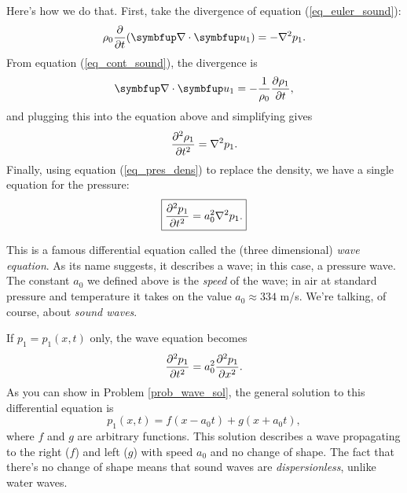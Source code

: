 Here's how we do that.  First, take the divergence of equation (\ref{eq_euler_sound}):
\[
\rho_0 \dfdx{}{t} (\grad \cdot \vec{u}_1 )= -\nabla^2 p_1.
\]
From equation (\ref{eq_cont_sound}), the divergence is
\[
\grad \cdot \vec{u}_1 = -\frac{1}{\rho_0} \dfdx{\rho_1}{t},
\]
and plugging this into the equation above and simplifying gives
\[
\frac{\partial^2 {\rho_1}}{\partial {t}^2} = \nabla^2 p_1.
\]
Finally, using equation (\ref{eq_pres_dens}) to replace the density, we have a single equation for the pressure:
\begin{equation}
\boxed{
\frac{\partial^2 {p_1}}{\partial {t}^2} = a_0^2 \nabla^2 p_1.
}
\end{equation}

This is a famous differential equation called the (three dimensional) \emph{wave equation}.  As its name suggests, it describes a wave; in this case, a pressure wave.  The constant $a_0$ we defined above is the \emph{speed} of the wave; in air at standard pressure and temperature it takes on the value $a_0 \approx 334$ m/s.  We're talking, of course, about \emph{sound waves}.

\begin{example}
If $p_1 = p_1(x, t)$ only, the wave equation becomes
\[
\frac{\partial^2 {p_1}}{\partial {t}^2} = a_0^2 \frac{\partial^2 {p_1}}{\partial {x}^2}.
\]
As you can show in Problem \ref{prob_wave_sol}, the general solution to this differential equation is
\begin{equation}
p_1(x, t) = f(x - a_0t) + g(x + a_0t),
\end{equation}
where $f$ and $g$ are arbitrary functions.  This solution describes a wave propagating to the right ($f$) and left ($g$) with speed $a_0$ and no change of shape.  The fact that there's no change of shape means that sound waves are \emph{dispersionless}, unlike water waves.
\end{example}

